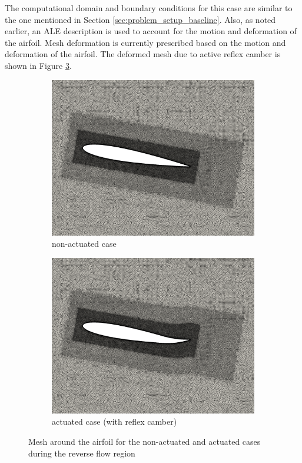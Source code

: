 The computational domain and boundary conditions for this case are similar to the one mentioned in Section \ref{sec:problem_setup_baseline}.
Also, as noted earlier, an ALE description is used to account for the motion and deformation of the airfoil.
Mesh deformation is currently prescribed based on the motion and deformation of the airfoil.
The deformed mesh due to active reflex camber is shown in Figure \ref{fig:mesh3}.


\begin{figure}[H]
	\centering
	\begin{subfigure}[b]{0.6\textwidth}
		\centering
		\includegraphics[width=1\textwidth]{figures/Setup/mesh}
		\caption{non-actuated case}
		\label{fig:mesh_non-actuated}
	\end{subfigure}

	\begin{subfigure}[b]{0.6\textwidth}
		\centering
		\includegraphics[width=1\textwidth]{figures/Setup/mesh_AC}
		\caption{actuated case (with reflex camber)}
		\label{fig:mesh_actuated}
	\end{subfigure}
	\caption{Mesh around the airfoil for the non-actuated and actuated cases during the reverse flow region}
	\label{fig:mesh3}
\end{figure}


